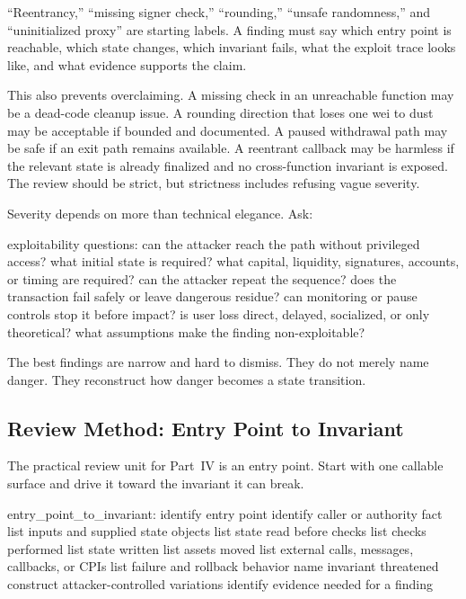 \begin{failuremodebox}
``Reentrancy,'' ``missing signer check,'' ``rounding,'' ``unsafe randomness,'' and ``uninitialized proxy'' are starting labels. A finding must say which entry point is reachable, which state changes, which invariant fails, what the exploit trace looks like, and what evidence supports the claim.
\end{failuremodebox}

This also prevents overclaiming. A missing check in an unreachable function may be a dead-code cleanup issue. A rounding direction that loses one wei to dust may be acceptable if bounded and documented. A paused withdrawal path may be safe if an exit path remains available. A reentrant callback may be harmless if the relevant state is already finalized and no cross-function invariant is exposed. The review should be strict, but strictness includes refusing vague severity.

Severity depends on more than technical elegance. Ask:

\begin{codeblock}
exploitability questions:
    can the attacker reach the path without privileged access?
    what initial state is required?
    what capital, liquidity, signatures, accounts, or timing are required?
    can the attacker repeat the sequence?
    does the transaction fail safely or leave dangerous residue?
    can monitoring or pause controls stop it before impact?
    is user loss direct, delayed, socialized, or only theoretical?
    what assumptions make the finding non-exploitable?
\end{codeblock}

The best findings are narrow and hard to dismiss. They do not merely name danger. They reconstruct how danger becomes a state transition.

\subsection{Review Method: Entry Point to Invariant}

The practical review unit for Part~IV is an entry point. Start with one callable surface and drive it toward the invariant it can break.

\begin{codeblock}
entry_point_to_invariant:
    identify entry point
    identify caller or authority fact
    list inputs and supplied state objects
    list state read before checks
    list checks performed
    list state written
    list assets moved
    list external calls, messages, callbacks, or CPIs
    list failure and rollback behavior
    name invariant threatened
    construct attacker-controlled variations
    identify evidence needed for a finding
\end{codeblock}

